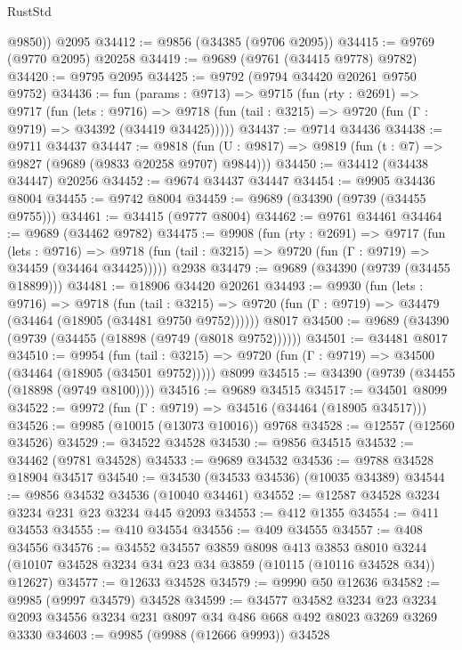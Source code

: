 \begin{lexlean}{RustStd}
\begin{coremodule}
        @9850))
    @2095
@34412 := @9856 (@34385 (@9706 @2095))
@34415 := @9769 (@9770 @2095) @20258
@34419 := @9689 (@9761 (@34415 @9778) @9782)
@34420 := @9795 @2095
@34425 := @9792 (@9794 @34420 @20261 @9750 @9752)
@34436 := fun (params : @9713) =>
  @9715
    (fun (rty : @2691) =>
    @9717
      (fun (lets : @9716) =>
      @9718 (fun (tail : @3215) => @9720 (fun (Γ : @9719) => @34392 (@34419 @34425)))))
@34437 := @9714 @34436
@34438 := @9711 @34437
@34447 := @9818
    (fun (U : @9817) => @9819 (fun (t : @7) => @9827 (@9689 (@9833 @20258 @9707) @9844)))
@34450 := @34412 (@34438 @34447) @20256
@34452 := @9674 @34437 @34447
@34454 := @9905 @34436 @8004
@34455 := @9742 @8004
@34459 := @9689 (@34390 (@9739 (@34455 @9755)))
@34461 := @34415 (@9777 @8004)
@34462 := @9761 @34461
@34464 := @9689 (@34462 @9782)
@34475 := @9908
    (fun (rty : @2691) =>
    @9717
      (fun (lets : @9716) =>
      @9718 (fun (tail : @3215) => @9720 (fun (Γ : @9719) => @34459 (@34464 @34425)))))
    @2938
@34479 := @9689 (@34390 (@9739 (@34455 @18899)))
@34481 := @18906 @34420 @20261
@34493 := @9930
    (fun (lets : @9716) =>
    @9718
      (fun (tail : @3215) =>
      @9720 (fun (Γ : @9719) => @34479 (@34464 (@18905 (@34481 @9750 @9752))))))
    @8017
@34500 := @9689 (@34390 (@9739 (@34455 (@18898 (@9749 (@8018 @9752))))))
@34501 := @34481 @8017
@34510 := @9954
    (fun (tail : @3215) => @9720 (fun (Γ : @9719) => @34500 (@34464 (@18905 (@34501 @9752)))))
    @8099
@34515 := @34390 (@9739 (@34455 (@18898 (@9749 @8100))))
@34516 := @9689 @34515
@34517 := @34501 @8099
@34522 := @9972 (fun (Γ : @9719) => @34516 (@34464 (@18905 @34517)))
@34526 := @9985 (@10015 (@13073 @10016)) @9768
@34528 := @12557 (@12560 @34526)
@34529 := @34522 @34528
@34530 := @9856 @34515
@34532 := @34462 (@9781 @34528)
@34533 := @9689 @34532
@34536 := @9788 @34528 @18904 @34517
@34540 := @34530 (@34533 @34536) (@10035 @34389)
@34544 := @9856 @34532 @34536 (@10040 @34461)
@34552 := @12587 @34528 @3234 @3234 @231 @23 @3234 @445 @2093
@34553 := @412 @1355
@34554 := @411 @34553
@34555 := @410 @34554
@34556 := @409 @34555
@34557 := @408 @34556
@34576 := @34552
    @34557
    @3859
    @8098
    @413
    @3853
    @8010
    @3244
    (@10107 @34528 @3234 @34 @23 @34 @3859 (@10115 (@10116 @34528 @34)) @12627)
@34577 := @12633 @34528
@34579 := @9990 @50 @12636
@34582 := @9985 (@9997 @34579) @34528
@34599 := @34577
    @34582
    @3234
    @23
    @3234
    @2093
    @34556
    @3234
    @231
    @8097
    @34
    @486
    @668
    @492
    @8023
    @3269
    @3269
    @3330
@34603 := @9985 (@9988 (@12666 @9993)) @34528

\end{coremodule}
\end{lexlean}
